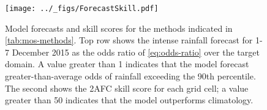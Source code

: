 \documentclass[twocol]{ametsoc}
\begin{document}
\begin{figure}
	\noindent\texttt{[image: ../\_figs/ForecastSkill.pdf]}
	\caption{
		Model forecasts and skill scores for the methods indicated in \cref{tab:mos-methods}.
		Top row shows the intense rainfall forecast for 1-7 December 2015 as the odds ratio of \cref{eq:odds-ratio} over the target domain.
		A value greater than 1 indicates that the model forecast greater-than-average odds of rainfall exceeding the 90th percentile.
		The second shows the 2AFC skill score for each grid cell; a value greater than 50 indicates that the model outperforms climatology.
	}
  \label{fig:subsprobfcst}
\end{figure}
\end{document}
